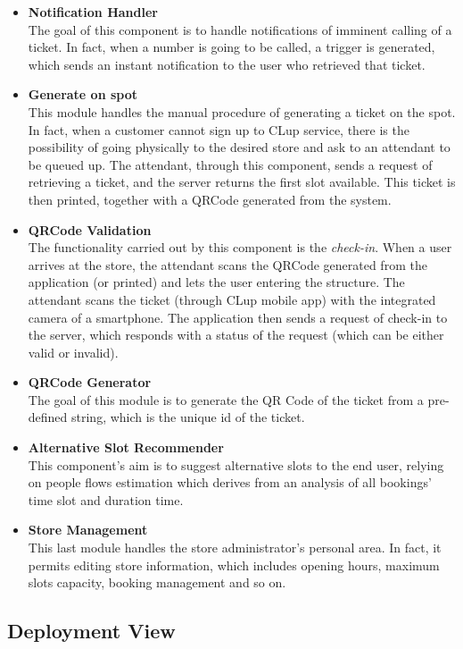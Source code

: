 \documentclass[table, 12pt]{article}
\begin{document}
\begin{itemize}
    \item \textbf{Notification Handler}\\The goal of this component is to handle notifications of imminent calling of a ticket. In fact, when a number is going to be called, a trigger is generated, which sends an instant notification to the user who retrieved that ticket.
    \item \textbf{Generate on spot}\\This module handles the manual procedure of generating a ticket on the spot. In fact, when a customer cannot sign up to CLup service, there is the possibility of going physically to the desired store and ask to an attendant to be queued up. The attendant, through this component, sends a request of retrieving a ticket, and the server returns the first slot available. This ticket is then printed, together with a QRCode generated from the system.
    \item \textbf{QRCode Validation}\\The functionality carried out by this component is the \textit{check-in}. When a user arrives at the store, the attendant scans the QRCode generated from the application (or printed) and lets the user entering the structure. The attendant scans the ticket (through CLup mobile app) with the integrated camera of a smartphone. The application then sends a request of check-in to the server, which responds with a status of the request (which can be either valid or invalid).
    \item \textbf{QRCode Generator}\\The goal of this module is to generate the QR Code of the ticket from a pre-defined string, which is the unique id of the ticket.
    \item \textbf{Alternative Slot Recommender}\\This component's aim is to suggest alternative slots to the end user, relying on people flows estimation which derives from an analysis of all bookings' time slot and duration time.
    \item \textbf{Store Management}\\This last module handles the store administrator's personal area. In fact, it permits editing store information, which includes opening hours, maximum slots capacity, booking management and so on.
\end{itemize}

\subsection{Deployment View}
\end{document}
